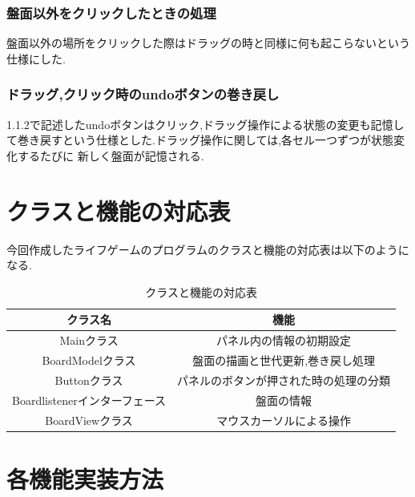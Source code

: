 \documentclass[dvipdfmx]{jarticle}
\begin{document}
\subsubsection{盤面以外をクリックしたときの処理}
盤面以外の場所をクリックした際はドラッグの時と同様に何も起こらないという仕様にした.
\subsubsection{ドラッグ,クリック時のundoボタンの巻き戻し}
1.1.2で記述したundoボタンはクリック,ドラッグ操作による状態の変更も記憶して巻き戻すという仕様とした.ドラッグ操作に関しては,各セル一つずつが状態変化するたびに
新しく盤面が記憶される.

\section{クラスと機能の対応表}
今回作成したライフゲームのプログラムのクラスと機能の対応表は以下のようになる.
\begin{table}[h]
  \centering
  \begin{tabular}{|c|c|}
    \hline
    クラス名&機能\\\hline\hline
    Mainクラス&パネル内の情報の初期設定\\\hline
    BoardModelクラス&盤面の描画と世代更新,巻き戻し処理\\\hline
    Buttonクラス&パネルのボタンが押された時の処理の分類\\\hline
    Boardlistenerインターフェース&盤面の情報\\\hline
    BoardViewクラス&マウスカーソルによる操作\\\hline
  \end{tabular}
  \caption{クラスと機能の対応表}
\end{table}


\section{各機能実装方法}
\end{document}
